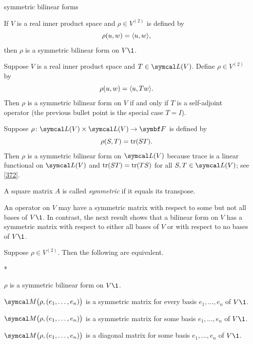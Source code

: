 \begin{example}{symmetric bilinear forms}
\begin{Itemize}
\item
If $V$ is a real inner product space and $\rho \in V^{(2)}$ is defined by
\[
\rho(u, w) = \langle u, w\rangle,
\]
then $\rho$ is a symmetric bilinear form on $V\1$.

\item
Suppose $V$ is a real inner product space and $T \in \L(V)$. Define $\rho \in V^{(2)}$ by
\[
\rho(u, w) = \langle u, Tw\rangle.
\]
Then $\rho$ is a symmetric bilinear form on $V$ if and only if $T$ is a self-adjoint operator (the previous bullet point is the special case $T = I$).

\item
Suppose $\fun \rho {\L(V) \times \L(V)} {\F{}}$ is defined by
\[
\rho(S,T) = \operatorname{tr}(ST).
\]
Then $\rho$ is a symmetric bilinear form on $\L(V)$ because trace is a linear functional on $\L(V)$ and $\operatorname{tr}(ST) = \operatorname{tr}(TS)$ for all
$S, T \in \L(V)$; see \ref{372}.
\end{Itemize}
\exampleitemend
\end{example}

{A square matrix $A$ is called \textit{symmetric} if it equals its transpose.}

 An operator on $V$ may have a symmetric matrix with respect to some but not all bases of $V\1$. In contrast, the next result shows that a bilinear form on $V$  has a symmetric matrix with respect to either all bases of $V$ or with respect to no bases of $V\1$.

{Suppose $\rho \in V^{(2)}\!$. Then the following are equivalent.
\begin{subtheorem}*
\item
$\rho$ is a symmetric bilinear form on $V\1$.
\item
$\M\paren[\big]{ \rho, (e_1, \ldots, e_n) }$ is a symmetric matrix for every basis $e_1, \ldots, e_n$ of $V\1$.
\item
$\M\paren[\big]{ \rho, (e_1, \ldots, e_n) }$ is a symmetric matrix for some basis $e_1, \ldots, e_n$ of $V\1$.
\item
$\M\paren[\big]{ \rho, (e_1, \ldots, e_n) }$ is a diagonal matrix for some basis $e_1, \ldots, e_n$ of $V\1$.
\end{subtheorem}}

\pagebreak[3]

